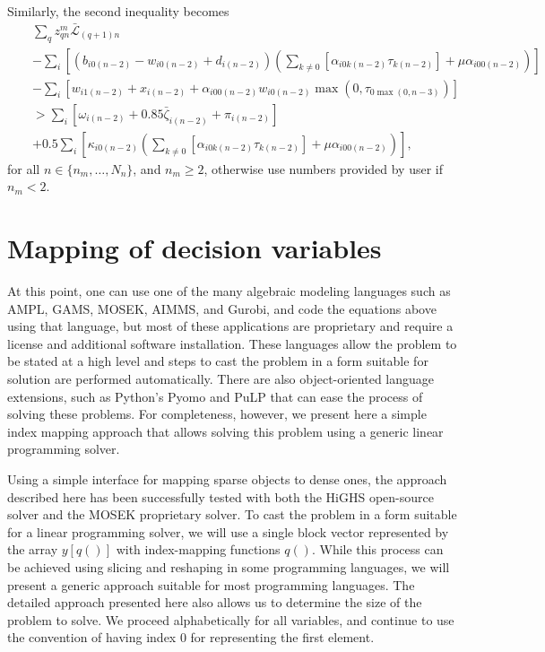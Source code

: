 \documentclass{report}[fleqn,11pt]
\begin{document}
	Similarly, the second inequality becomes
	\begin{eqnarray}
		\label{Eq:Med2}
		&& \sum_q z_{qn}^m \bar{\mathcal{L}}_{(q+1)n} \nonumber\\
		&& - \sum_{i} \left[(b_{i0(n-2)} - w_{i0(n-2)} + d_{i(n-2)})
		\left(\sum_{k\neq 0} [\alpha_{i0k(n-2)}\tau_{k(n-2)}] + \mu\alpha_{i00(n-2)}\right)\right] \nonumber\\
		&& - \sum_i \left[w_{i1(n-2)} + x_{i(n-2)}
		  + \alpha_{i00(n-2)}w_{i0(n-2)}\max(0, \tau_{0\max(0, n-3)})\right] \nonumber\\
		&& > \sum_i [\omega_{i(n-2)} + 0.85\bar{\zeta}_{i(n-2)} + \pi_{i(n-2)} ] \nonumber\\
		&& + 0.5 \sum_{i} \left[\kappa_{i0(n-2)}
		\left(\sum_{k\neq 0} [\alpha_{i0k(n-2)}\tau_{k(n-2)}] + \mu\alpha_{i00(n-2)}\right)\right],
	\end{eqnarray}
	for all $n \in \{n_m, \ldots, N_n\}$, and $n_m \ge 2$,
	otherwise use numbers provided by user if $n_m < 2$.

\chapter{Mapping of decision variables}
At this point, one can use one of the many algebraic modeling languages
such as AMPL, GAMS, MOSEK, AIMMS, and Gurobi, and code the equations above
using that language, but most of these applications are
proprietary and require a license and additional software installation.
These languages allow the problem to be stated at a high level and
steps to cast the problem in a form suitable for solution are performed automatically.
There are also object-oriented language extensions, such as Python's Pyomo
and PuLP that can ease the process of solving these problems.
For completeness, however, we present here a simple
index mapping approach that allows solving this problem using a generic
linear programming solver.

Using a simple interface for mapping sparse objects to dense ones, the approach described here
has been successfully tested with both the HiGHS open-source solver
and the MOSEK proprietary solver.
To cast the problem in a form suitable for a linear programming solver, we will use
a single block vector represented by the array $y[q()]$ with index-mapping functions $q()$.
While this process can be achieved using slicing and reshaping in some programming
languages, we will present a generic approach suitable for most programming languages.
The detailed approach presented here also allows us to determine the size of the problem to solve.
We proceed alphabetically for all variables, and continue to use the convention of having
index 0 for representing the first element.
\end{document}
